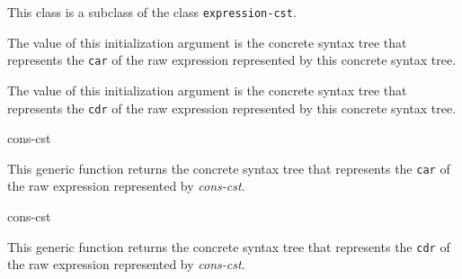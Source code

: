 
This class is a subclass of the class \texttt{expression-cst}.


The value of this initialization argument is the concrete syntax tree
that represents the \texttt{car} of the raw \commonlisp{} expression
represented by this concrete syntax tree.


The value of this initialization argument is the concrete syntax tree
that represents the \texttt{cdr} of the raw \commonlisp{} expression
represented by this concrete syntax tree.

 {cons-cst}

This generic function returns the concrete syntax tree that represents
the \texttt{car} of the raw \commonlisp{} expression represented by
\textit{cons-cst}.

 {cons-cst}

This generic function returns the concrete syntax tree that represents
the \texttt{cdr} of the raw \commonlisp{} expression represented by
\textit{cons-cst}.
